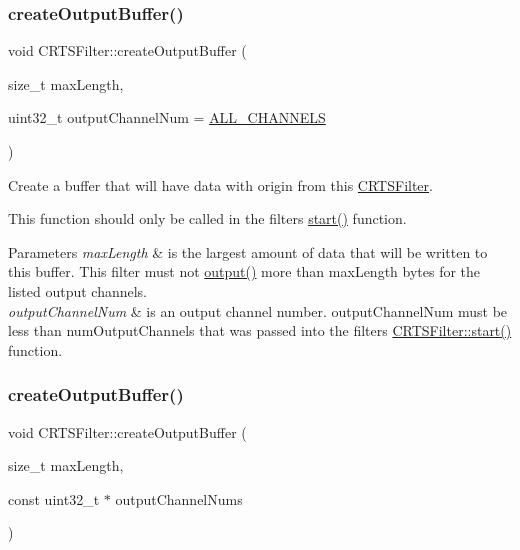 \subsubsection{\texorpdfstring{create\+Output\+Buffer()}{createOutputBuffer()}\hspace{0.1cm}{\footnotesize\ttfamily [1/2]}}
{\footnotesize\ttfamily void C\+R\+T\+S\+Filter\+::create\+Output\+Buffer (\begin{DoxyParamCaption}\item[{size\+\_\+t}]{max\+Length,  }\item[{uint32\+\_\+t}]{output\+Channel\+Num = {\ttfamily \hyperlink{classCRTSFilter_a9ea354654e8e2e8ce3bff293cc35fafe}{A\+L\+L\+\_\+\+C\+H\+A\+N\+N\+E\+LS}} }\end{DoxyParamCaption})\hspace{0.3cm}{\ttfamily [protected]}}

Create a buffer that will have data with origin from this \hyperlink{classCRTSFilter}{C\+R\+T\+S\+Filter}.

This function should only be called in the filters\textquotesingle{} \hyperlink{classCRTSFilter_a15a3e99b38a67fd40559776d468b95fa}{start()} function.


\begin{DoxyParams}{Parameters}
{\em max\+Length} & is the largest amount of data that will be written to this buffer. This filter must not \hyperlink{classCRTSFilter_afe899250f3aa73aa8eb5aed7dfc371de}{output()} more than {\ttfamily max\+Length} bytes for the listed output channels.\\
\hline
{\em output\+Channel\+Num} & is an output channel number. output\+Channel\+Num must be less than num\+Output\+Channels that was passed into the filters {\ttfamily \hyperlink{classCRTSFilter_a15a3e99b38a67fd40559776d468b95fa}{C\+R\+T\+S\+Filter\+::start()}} function. \\
\hline
\end{DoxyParams}
\mbox{\label{classCRTSFilter_acc8f53beaf044b384b94e1166a2c53ca}} 
\subsubsection{\texorpdfstring{create\+Output\+Buffer()}{createOutputBuffer()}\hspace{0.1cm}{\footnotesize\ttfamily [2/2]}}
{\footnotesize\ttfamily void C\+R\+T\+S\+Filter\+::create\+Output\+Buffer (\begin{DoxyParamCaption}\item[{size\+\_\+t}]{max\+Length,  }\item[{const uint32\+\_\+t $\ast$}]{output\+Channel\+Nums }\end{DoxyParamCaption})\hspace{0.3cm}{\ttfamily [protected]}}

